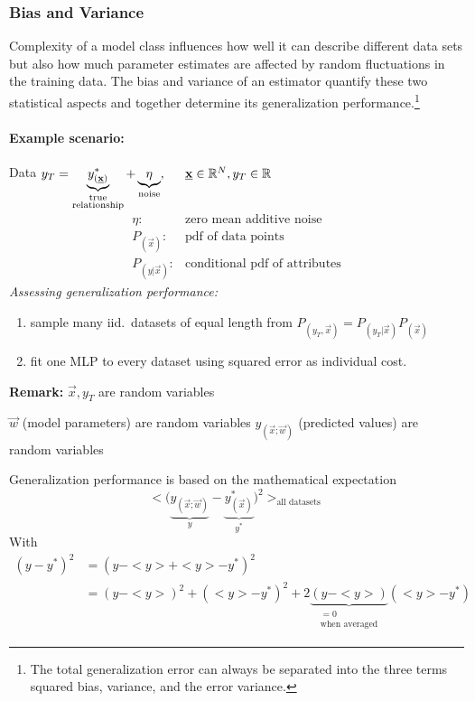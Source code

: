 \subsubsection{Bias and Variance}
Complexity of a model class influences how well it can describe
different data sets but also how much parameter estimates are affected
by random fluctuations in the training data. The bias and variance of
an estimator quantify these two statistical aspects and together
determine its generalization performance.\footnote{The total
  generalization error can always be separated into the three terms
  squared bias, variance, and the error variance.}

\paragraph{Example scenario:} Data $y_T = \underbrace{y_{(\vec{x})}^*}_{\substack{\text{true} \\ \text{relationship}}} + \underbrace{\eta}_{\text{noise}}, \indent\vec{x} \in \mathbb{R}^N, y_T \in \mathbb{R}$
\[ \begin{array}{ll}
	\eta: & \text{zero mean additive noise} \\
	P_{(\vec{x})}: & \text{pdf of data points} \\
	P_{(y|\vec{x})}: & \text{conditional pdf of attributes}
\end{array} \]
\emph{Assessing generalization performance:}
\begin{enumerate}
\item sample many iid.\ datasets of equal length from $ P_{(y_T,
    \vec{x})} = P_{(y_T| \vec{x})} P_{(\vec{x})}$
\item fit one MLP to every dataset using squared error as individual
  cost.
\end{enumerate}
\textbf{Remark:} $\vec{x}, y_T$ are random variables
\begin{itemize}
	\itr $\vec{w}$ (model parameters) are random variables
	\itr $y_{(\vec{x};\vec{w})}$ (predicted values) are random variables
\end{itemize}
Generalization performance is based on the mathematical expectation
\begin{equation} \tag{''ensemble average''}
	\Big< \Big( \underbrace{y_{(\vec{x};\vec{w})}}_{y} 
		- \underbrace{y_{(\vec{x})}^*}_{y^*} 
		\Big)^2 \Big>_{
		\text{all datasets}}
\end{equation}
With
\begin{equation}
	\begin{array}{ll}
	(y - y^*)^2 
	& = (y - <y> + <y> - y^*)^2 \\
	& = (y - <y>)^2 + (<y> - y^*)^2 + 2 \underbrace{(y - <y>)}_{
		\substack{ = 0 \\ \text{when averaged}}} 
		(<y> - y^*)
	\end{array}
\end{equation}
